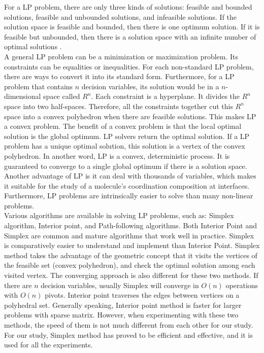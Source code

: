 For a LP problem, there are only three kinds of solutions: feasible and bounded solutions, feasible and unbounded solutions, and infeasible solutions. If the solution space is feasible and bounded, then there is one optimum solution. If it is feasible but unbounded, then there is a solution space with an infinite number of optimal solutions \cite{LP}. \\

A general LP problem can be a minimization or maximization problem. Its constraints can be equalities or inequalities. For each non-standard LP problem, there are ways to convert it into its standard form. Furthermore, for a LP problem that contains $n$ decision variables, its solution would be in a $n$-dimensional space called $R^{n}$. Each constraint is a hyperplane. It divides the $R^{n}$ space into two half-spaces. Therefore, all the constraints together cut this $R^{n}$ space into a convex polyhedron when there are feasible solutions. This makes LP a convex problem. The benefit of a convex problem is that the local optimal solution is the global optimum. LP solvers return the optimal solution. If a LP problem has a unique optimal solution, this solution is a vertex of the convex polyhedron. In another word, LP is a convex, deterministic process. It is guaranteed to converge to a single global optimum if there is a solution space. \\

Another advantage of LP is it can deal with thousands of variables, which makes it suitable for the study of a molecule's coordination composition at interfaces. Furthermore, LP problems are intrinsically easier to solve than many non-linear problems. \\

Various algorithms are available in solving LP problems, such as: Simplex algorithm, Interior point, and Path-following algorithms. Both Interior Point and Simplex are common and mature algorithms that work well in practice. Simplex is comparatively easier to understand and implement than Interior Point. Simplex method takes the advantage of the geometric concept that it visits the vertices of the feasible set (convex polyhedron), and check the optimal solution among each visited vertex. The converging approach is also different for these two methods. If there are $n$ decision variables, usually Simplex will converge in $O(n)$ operations with $O(n)$ pivots. Interior point traverses the edges between vertices on a polyhedral set. Generally speaking, Interior point method is faster for larger problems with sparse matrix. However, when experimenting with these two methods, the speed of them is not much different from each other for our study. For our study, Simplex method has proved to be efficient and effective, and it is used for all the experiments. \\

